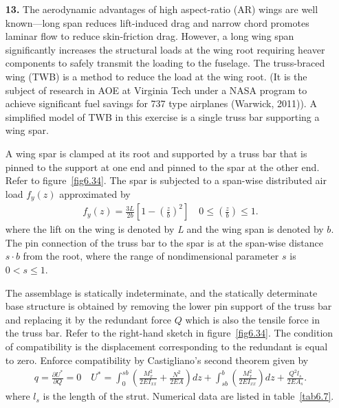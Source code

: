 \documentclass{AeroStructure-ERJohnson}
\begin{document}
\begin{exercise}
\begin{enumerate}[\textbf{2.}]
\item[\textbf{13.}]  The aerodynamic advantages of high aspect-ratio (AR) wings are well known---long span reduces lift-induced drag and narrow chord promotes laminar flow to reduce skin-friction drag. However, a long wing span significantly increases the structural loads at the wing root requiring heaver components to safely transmit the loading to the fuselage. The truss-braced wing (TWB) is a method to reduce the load at the wing root. (It is the subject of research in AOE at Virginia Tech under a NASA program to achieve significant fuel savings for 737 type airplanes (Warwick, 2011)). A simplified model of TWB in this exercise is a single truss bar supporting a wing spar.

\bigskip

A wing spar is clamped at its root and supported by a truss bar that is pinned to the support at one end and pinned to the spar at the other end. Refer to figure~\ref{fig6.34}. The spar is subjected to a span-wise distributed air load $f_{y}(z)$ approximated by
\setcounter{equation}{0}\def\theequation{\alph{equation}}
\begin{align}
f_{y}(z)=\frac{3 L}{2 b}\left[1-\left(\frac{z}{b}\right)^{2}\right] \quad 0 \leq\left(\frac{z}{b}\right) \leq 1.
\end{align}
where the lift on the wing is denoted by \textit{L} and the wing span is denoted by $b$. The pin connection of the truss bar to the spar is at the span-wise distance $s \cdot b$ from the root, where the range of nondimensional parameter $s$ is $0<s \leq 1$.

\medskip

The assemblage is statically indeterminate, and the statically determinate base structure is obtained by removing the lower pin support of the truss bar and replacing it by the redundant force $Q$ which is also the tensile force in the truss bar. Refer to the right-hand sketch in figure~\ref{fig6.34}. The condition of compatibility is the displacement corresponding to the redundant is equal to zero. Enforce compatibility by Castigliano's second theorem given by
\begin{align}
q=\frac{\partial U^{*}}{\partial Q}=0 \quad U^{*}=\int_{0}^{s b}\left(\frac{M_{x}^{2}}{2 E I_{x x}}+\frac{N^{2}}{2 E A}\right) d z+\int_{s b}^{b}\left(\frac{M_{x}^{2}}{2 E I_{x x}}\right) d z+\frac{Q^{2} l_{s}}{2 E A_{s}}.
\end{align}
where $l_{s}$ is the length of the strut. Numerical data are listed in table~\ref{tab6.7}.


\end{enumerate}
\end{exercise}
\end{document}
